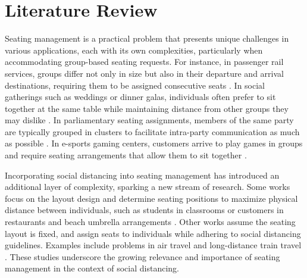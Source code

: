 \section{Literature Review}\label{literature}


Seating management is a practical problem that presents unique challenges in various applications, each with its own complexities, particularly when accommodating group-based seating requests. For instance, in passenger rail services, groups differ not only in size but also in their departure and arrival destinations, requiring them to be assigned consecutive seats \citep{clausen2010off, deplano2019offline}. In social gatherings such as weddings or dinner galas, individuals often prefer to sit together at the same table while maintaining distance from other groups they may dislike \citep{lewis2016creating}. In parliamentary seating assignments, members of the same party are typically grouped in clusters to facilitate intra-party communication as much as possible \citep{vangerven2022parliament}. In e-sports gaming centers, customers arrive to play games in groups and require seating arrangements that allow them to sit together \citep{kwag2022optimal}.

Incorporating social distancing into seating management has introduced an additional layer of complexity, sparking a new stream of research. Some works focus on the layout design and determine seating positions to maximize physical distance between individuals, such as students in classrooms \citep{bortolete2022support} or customers in restaurants and beach umbrella arrangements \citep{fischetti2023safe}. Other works assume the seating layout is fixed, and assign seats to individuals while adhering to social distancing guidelines. Examples include problems in air travel \citep{ghorbani2020model} and long-distance train travel \citep{haque2022optimization}. These studies underscore the growing relevance and importance of seating management in the context of social distancing.


